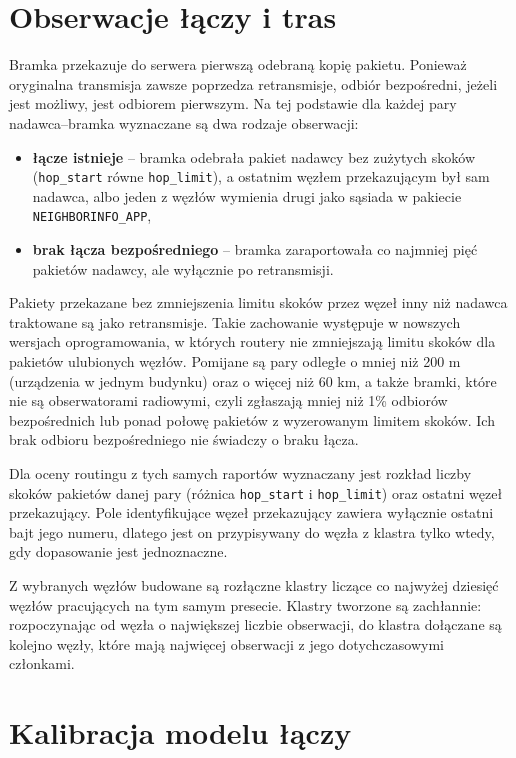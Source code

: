 \section{Obserwacje łączy i tras}

Bramka przekazuje do serwera pierwszą odebraną kopię pakietu. Ponieważ oryginalna transmisja zawsze poprzedza retransmisje, odbiór bezpośredni, jeżeli jest możliwy, jest odbiorem pierwszym. Na tej podstawie dla każdej pary nadawca--bramka wyznaczane są dwa rodzaje obserwacji:

\begin{itemize}
\item \textbf{łącze istnieje} -- bramka odebrała pakiet nadawcy bez zużytych skoków (\texttt{hop\_start} równe \texttt{hop\_limit}), a ostatnim węzłem przekazującym był sam nadawca, albo jeden z węzłów wymienia drugi jako sąsiada w pakiecie \texttt{NEIGHBORINFO\_APP},
\item \textbf{brak łącza bezpośredniego} -- bramka zaraportowała co najmniej pięć pakietów nadawcy, ale wyłącznie po retransmisji.
\end{itemize}

Pakiety przekazane bez zmniejszenia limitu skoków przez węzeł inny niż nadawca traktowane są jako retransmisje. Takie zachowanie występuje w nowszych wersjach oprogramowania, w których routery nie zmniejszają limitu skoków dla pakietów ulubionych węzłów. Pomijane są pary odległe o mniej niż 200 m (urządzenia w jednym budynku) oraz o więcej niż 60 km, a także bramki, które nie są obserwatorami radiowymi, czyli zgłaszają mniej niż 1\% odbiorów bezpośrednich lub ponad połowę pakietów z wyzerowanym limitem skoków. Ich brak odbioru bezpośredniego nie świadczy o braku łącza.

Dla oceny routingu z tych samych raportów wyznaczany jest rozkład liczby skoków pakietów danej pary (różnica \texttt{hop\_start} i \texttt{hop\_limit}) oraz ostatni węzeł przekazujący. Pole identyfikujące węzeł przekazujący zawiera wyłącznie ostatni bajt jego numeru, dlatego jest on przypisywany do węzła z klastra tylko wtedy, gdy dopasowanie jest jednoznaczne.

Z wybranych węzłów budowane są rozłączne klastry liczące co najwyżej dziesięć węzłów pracujących na tym samym presecie. Klastry tworzone są zachłannie: rozpoczynając od węzła o największej liczbie obserwacji, do klastra dołączane są kolejno węzły, które mają najwięcej obserwacji z jego dotychczasowymi członkami.

\section{Kalibracja modelu łączy}


